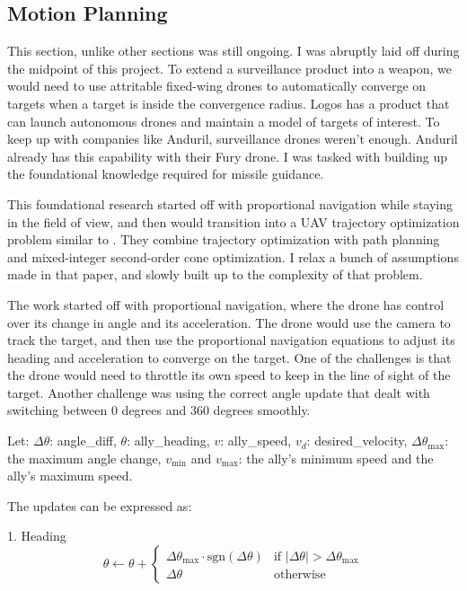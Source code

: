 \documentclass[12pt]{article}
\begin{document}
\subsection{Motion Planning}
This section, unlike other sections was still ongoing. I was abruptly laid off during the midpoint of this project.  To extend a surveillance product into a weapon, we would need to use attritable fixed-wing drones to automatically converge on targets when a target is inside the convergence radius. Logos has a product that can launch autonomous drones and maintain a model of targets of interest. To keep up with companies like Anduril, surveillance drones weren't enough. Anduril already has this capability with their Fury drone.\cite{andurilIntroducingFuryAutonomous} I was tasked with building up the foundational knowledge required for missile guidance.

This foundational research started off with proportional navigation while staying in the field of view, and then would transition into a UAV trajectory optimization problem similar to \cite{marcucciMotionPlanningObstacles2022}. They combine trajectory optimization with path planning and mixed-integer second-order cone optimization. I relax a bunch of assumptions made in that paper, and slowly built up to the complexity of that problem.

The work started off with proportional navigation, where the drone has control over its change in angle and its acceleration. The drone would use the camera to track the target, and then use the proportional navigation equations to adjust its heading and acceleration to converge on the target. One of the challenges is that the drone would need to throttle its own speed to keep in the line of sight of the target. Another challenge was using the correct angle update that dealt with switching between 0 degrees and 360 degrees smoothly.

Let: \( \Delta \theta \): angle\_diff, \( \theta \): ally\_heading, \( v \): ally\_speed, \( v_d \): desired\_velocity, \( \Delta \theta_{\text{max}} \): the maximum angle change, \( v_{\text{min}} \) and \( v_{\text{max}} \): the ally's minimum speed and the ally's maximum speed.

The updates can be expressed as:

1. Heading
\[
\theta \leftarrow \theta + 
\begin{cases} 
\Delta \theta_{\text{max}} \cdot \text{sgn}(\Delta \theta) & \text{if } |\Delta \theta| > \Delta \theta_{\text{max}} \\
\Delta \theta & \text{otherwise}
\end{cases}
\]
\end{document}
